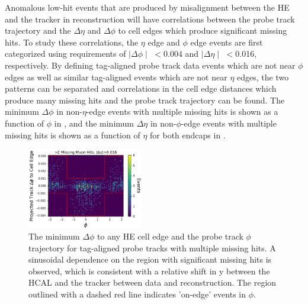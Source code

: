 Anomalous low-hit events that are produced by misalignment between the HE and the tracker in reconstruction will have correlations between the probe track trajectory and the $\Delta\eta$ and $\Delta\phi$ to cell edges which produce significant missing hits. 
To study these correlations, the $\eta$ edge and $\phi$ edge events are first categorized using requirements of $\mid\Delta\phi\mid$ $<$0.004 and $\mid\Delta\eta\mid$ $<$0.016, respectively. 
By defining tag-aligned probe track data events which are not near $\phi$ edges as well as similar tag-aligned events which are not near $\eta$ edges, the two patterns can be separated and correlations in the cell edge distances which produce many missing hits and the probe track trajectory can be found. 
The minimum $\Delta\phi$ in non-$\eta$-edge events with multiple missing hits is shown as a function of $\phi$ in , and the minimum $\Delta\eta$ in non-$\phi$-edge events with multiple missing hits is shown as a function of $\eta$ for both endcaps in .

\begin{figure}[htpb]
    \includegraphics[width=0.45\textwidth]{figures/phiEdgeEventsData.png} 
    \centering
	\caption[$\phi$ edge correlations in missing HCAL muon hits.]{The minimum $\Delta\phi$ to any HE cell edge and the probe track $\phi$ trajectory for tag-aligned probe tracks with multiple missing hits. A sinusoidal dependence on the region with significant missing hits is observed, which is consistent with a relative shift in y between the HCAL and the tracker between data and reconstruction. The region outlined with a dashed red line indicates 'on-edge' events in $\phi$.}
    \label{fig:phiEdgeCorr}
\end{figure}

